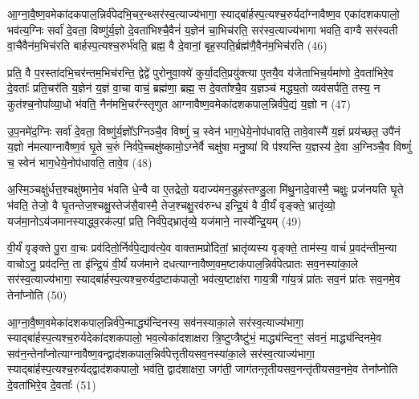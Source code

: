 आ॒ग्ना॒वै॒ष्ण॒वमेका॑दकपाल॒न्निर्व॑पेदभि॒चर॒न्थ्सर॑स्व॒त्याज्य॑भागा॒ स्याद्बा॑र्\mbox{}हस्प॒त्यश्च॒रुर्यदा᳚ग्नावैष्ण॒व एका॑दशकपालो॒ भव॑त्य॒ग्निः सर्वा॑ दे॒वता॒ विष्णु॑र्य॒ज्ञो दे॒वता॑भिश्चै॒वैनं॑ य॒ज्ञेन॑ चा॒भिच॑रति॒ सर॑स्व॒त्याज्य॑भागा भवति॒ वाग्वै सर॑स्वती वा॒चैवैन॑म॒भिच॑रति बार्\mbox{}हस्प॒त्यश्च॒रुर्भ॑वति॒ ब्रह्म॒ वै दे॒वानां॒ बृह॒स्पति॒र्ब्रह्म॑णै॒वैन॑म॒भिच॑रति (46)

प्रति॒ वै प॒रस्ता॑दभि॒चर॑न्तम॒भिच॑रन्ति॒ द्वेद्वे॑ पुरोनुवा॒क्ये॑ कुर्या॒दति॒प्रयु॑क्त्या ए॒तयै॒व य॑जेताभिच॒र्यमा॑णो दे॒वता॑भिरे॒व दे॒वताः᳚ प्रति॒चर॑ति य॒ज्ञेन॑ य॒ज्ञं वा॒चा वाचं॒ ब्रह्म॑णा॒ ब्रह्म॒ स दे॒वता᳚श्चै॒व य॒ज्ञञ्च॑ मद्ध्य॒तो व्यव॑सर्पति॒ तस्य॒ न कुत॑श्च॒नोपा᳚व्या॒धो भ॑वति॒ नैन॑मभि॒चर᳚न्स्तृणुत आग्नावैष्ण॒वमेका॑दशकपाल॒न्निर्व॑पे॒द्यं य॒ज्ञो न (47)

उ॒प॒नमे॑द॒ग्निः सर्वा॑ दे॒वता॒ विष्णु॑र्य॒ज्ञो᳚\-ऽग्निञ्चै॒व विष्णुं॑ च॒ स्वेन॑ भाग॒धेये॒नोप॑धावति॒ तावे॒वास्मै॑ य॒ज्ञं प्रय॑च्छत॒ उपै॑नं य॒ज्ञो न॑मत्याग्नावैष्ण॒वं घृ॒ते च॒रुं निर्व॑पे॒च्चक्षु॑ष्कामो॒\-ऽग्नेर्वै चक्षु॑षा मनु॒ष्या॑ वि प॑श्यन्ति य॒ज्ञस्य॑ दे॒वा अ॒ग्निञ्चै॒व विष्णुं॑ च॒ स्वेन॑ भाग॒धेये॒नोप॑धावति॒ तावे॒व (48)

अ॒स्मि॒ञ्चक्षु॑र्धत्त॒श्चक्षु॑ष्माने॒व भ॑वति धे॒न्वै वा ए॒तद्रेतो॒ यदाज्य॑मन॒डुह॑स्तण्डु॒ला मि॑थु॒नादे॒वास्मै॒ चक्षुः॒ प्रज॑नयति घृ॒ते भ॑वति॒ तेजो॒ वै घृ॒तन्तेज॒श्चक्षु॒स्तेज॑सै॒वास्मै॒ तेज॒श्चक्षु॒रव॑रुन्ध इन्द्रि॒यं वै वी॒र्यं॑ वृङ्क्ते॒ भ्रातृ॑व्यो॒ यज॑मा॒नो\-ऽय॑जमानस्याद्ध्व॒रक॑ल्पां॒ प्रति॒ निर्व॑पे॒द्भ्रातृ॑व्ये॒ यज॑माने॒ नास्ये᳚न्द्रि॒यम् (49)

वी॒र्यं॑ वृङ्क्ते पु॒रा वा॒चः प्रव॑दितो॒र्निर्व॑पे॒द्याव॑त्ये॒व वाक्तामप्रो॑दितां॒ भ्रातृ॑व्यस्य वृङ्क्ते॒ ताम॑स्य॒ वाचं॑ प्र॒वद॑न्तीम॒न्या वाचो\-ऽनु॒ प्रव॑दन्ति॒ ता इ॑न्द्रि॒यं वी॒र्यं॑ यज॑माने दधत्याग्नावैष्ण॒वम॒ष्टाक॑पाल॒न्निर्व॑पेत्प्रातः सव॒नस्या॑का॒ले सर॑स्व॒त्याज्य॑भागा॒ स्याद्बा॑र्\mbox{}हस्प॒त्यश्च॒रुर्यद॒ष्टाक॑पालो॒ भव॑त्य॒ष्टाक्ष॑रा गाय॒त्री गा॑य॒त्रं प्रा॑तः सव॒नं प्रा॑तः सव॒नमे॒व तेना᳚प्नोति (50)

आ॒ग्ना॒वै॒ष्ण॒वमेका॑दशकपाल॒न्निर्व॑पे॒न्माद्ध्य॑न्दिनस्य॒ सव॑नस्याका॒ले सर॑स्व॒त्याज्य॑भागा॒ स्याद्बा॑र्\mbox{}हस्प॒त्यश्च॒रुर्यदेका॑दशकपालो॒ भव॒त्येका॑दशाक्षरा त्रि॒ष्टुप्त्रैष्टु॑भं॒ माद्ध्य॑न्दिन॒ꣳ॒ स॑वनं॒ माद्ध्य॑न्दिनमे॒व सव॑न॒न्तेना᳚प्नोत्याग्नावैष्ण॒वन्द्वाद॑शकपाल॒न्निर्व॑पेत्तृतीयसव॒नस्या॑का॒ले सर॑स्व॒त्याज्य॑भागा॒ स्याद्बा॑र्\mbox{}हस्प॒त्यश्च॒रुर्यद्द्वाद॑शकपालो॒ भव॑ति॒ द्वाद॑शाक्षरा॒ जग॑ती॒ जाग॑तन्त़ृतीयसव॒नन्तृ॑तीयसव॒नमे॒व तेना᳚प्नोति दे॒वता॑भिरे॒व दे॒वताः᳚ (51)

